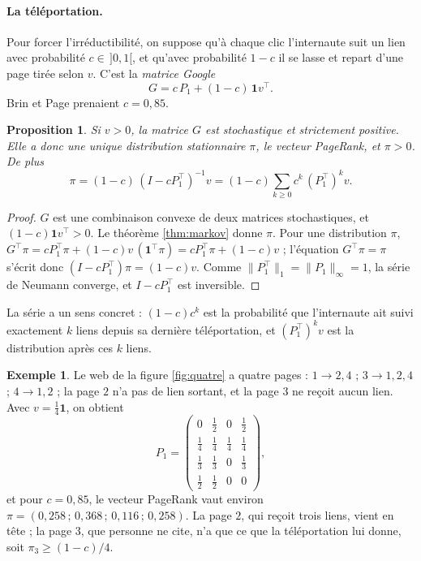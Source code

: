 \documentclass[11pt,a4paper]{article}
\theoremstyle{plain}
\newtheorem{proposition}[theoreme]{Proposition}
\theoremstyle{definition}
\newtheorem{exemple}[theoreme]{Exemple}
\theoremstyle{remark}
\newcommand{\un}{\mathbf{1}}
\begin{document}
\paragraph{La téléportation.} Pour forcer l'irréductibilité, on suppose qu'à chaque clic l'internaute suit un lien avec probabilité $c\in\,]0,1[$, et qu'avec probabilité $1-c$ il se lasse et repart d'une page tirée selon $v$. C'est la \emph{matrice Google}
\[
  G=c\,P_1+(1-c)\,\un v^\top .
\]
Brin et Page prenaient $c=0{,}85$.

\begin{proposition}\label{prop:google}
Si $v>0$, la matrice $G$ est stochastique et strictement positive. Elle a donc une unique distribution stationnaire $\pi$, le \emph{vecteur PageRank}, et $\pi>0$. De plus
\[
  \pi=(1-c)\,(I-cP_1^\top)^{-1}v=(1-c)\sum_{k\geq0}c^k\,(P_1^\top)^kv .
\]
\end{proposition}

\begin{proof}
$G$ est une combinaison convexe de deux matrices stochastiques, et $(1-c)\un v^\top>0$. Le théorème \ref{thm:markov} donne $\pi$. Pour une distribution $\pi$, $G^\top\pi=cP_1^\top\pi+(1-c)v\,(\un^\top\pi)=cP_1^\top\pi+(1-c)v$ ; l'équation $G^\top\pi=\pi$ s'écrit donc $(I-cP_1^\top)\pi=(1-c)v$. Comme $\|P_1^\top\|_1=\|P_1\|_\infty=1$, la série de Neumann converge, et $I-cP_1^\top$ est inversible.
\end{proof}

La série a un sens concret : $(1-c)c^k$ est la probabilité que l'internaute ait suivi exactement $k$ liens depuis sa dernière téléportation, et $(P_1^\top)^kv$ est la distribution après ces $k$ liens.

\begin{exemple}\label{ex:quatre}
Le web de la figure \ref{fig:quatre} a quatre pages : $1\to2,4$ ; $3\to1,2,4$ ; $4\to1,2$ ; la page $2$ n'a pas de lien sortant, et la page $3$ ne reçoit aucun lien. Avec $v=\frac14\un$, on obtient
\[
  P_1=\begin{pmatrix}0&\frac12&0&\frac12\\[2pt] \frac14&\frac14&\frac14&\frac14\\[2pt] \frac13&\frac13&0&\frac13\\[2pt] \frac12&\frac12&0&0\end{pmatrix},
\]
et pour $c=0{,}85$, le vecteur PageRank vaut environ $\pi=(0{,}258\,;\,0{,}368\,;\,0{,}116\,;\,0{,}258)$. La page $2$, qui reçoit trois liens, vient en tête ; la page $3$, que personne ne cite, n'a que ce que la téléportation lui donne, soit $\pi_3\geq(1-c)/4$.
\end{exemple}
\end{document}
